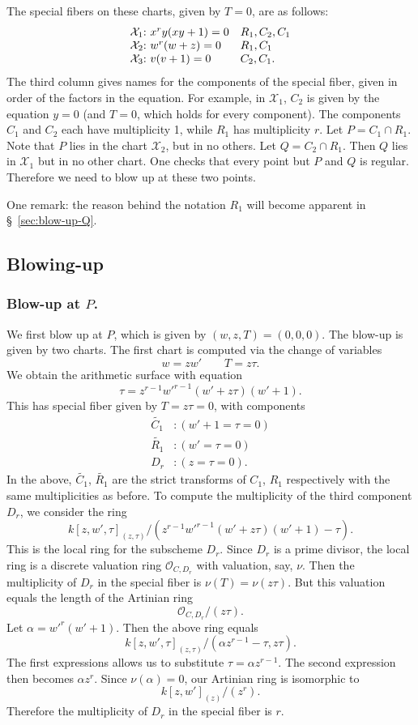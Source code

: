 \documentclass[reqno]{amsart}
\theoremstyle{definition}
\theoremstyle{remark}
\def\XX{\mathcal{X}}
\def\sO{\mathcal{O}}
\begin{document}
The special fibers on these charts, given by $T = 0$, are as follows:
\[
\begin{array}{l@{:\,\,}ll}
\XX_1 & x^ry(xy+1) = 0 & R_1, C_2, C_1 \\
\XX_2 & w^r(w + z) = 0 & R_1, C_1 \\
\XX_3 & v(v + 1) = 0 & C_2, C_1.
\end{array}
\]
The third column gives names for the components of the special fiber, given in order of the factors in the equation. For example, in $\XX_1$, $C_2$ is given by the equation $y = 0$ (and $T = 0$, which holds for every component). The components $C_1$ and $C_2$ each have multiplicity 1, while $R_1$ has multiplicity $r$. Let $P = C_1 \cap R_1$. Note that $P$ lies in the chart $\XX_2$, but in no others. Let $Q = C_2 \cap R_1$. Then $Q$ lies in $\XX_1$ but in no other chart. One checks that every point but $P$ and $Q$ is regular. Therefore we need to blow up at these two points.

One remark: the reason behind the notation $R_1$ will become apparent in \S~\ref{sec:blow-up-Q}.

\subsection{Blowing-up}
\label{sec:blowing-up}

\subsubsection{Blow-up at $P$.}
\label{sec:blow-up-P}

We first blow up at $P$, which is given by $(w,z,T) = (0,0,0)$. The blow-up is given by two charts. The first chart is computed via the change of variables
\[
w = zw' \qquad T = z\tau.
\]
We obtain the arithmetic surface with equation
\[
\tau = z^{r-1}w'^{r-1}(w' + z\tau)(w' + 1).
\]
This has special fiber given by $T = z\tau = 0$, with components
\begin{align*}
  \tilde{C_1}&: (w' + 1 = \tau = 0) \\
  \tilde{R_1}&: (w' = \tau = 0) \\
  D_r&: (z = \tau = 0).
\end{align*}
In the above, $\tilde{C_1}$, $\tilde{R_1}$ are the strict transforms of $C_1$, $R_1$ respectively with the same multiplicities as before. To compute the multiplicity of the third component $D_r$, we consider the ring
\[
{k[z,w',\tau]_{(z,\tau)}}/{(z^{r-1}w'^{r-1}(w' + z\tau)(w' + 1) - \tau)}.
\]
This is the local ring for the subscheme $D_r$. Since $D_r$ is a prime divisor, the local ring is a discrete valuation ring $\sO_{C,D_r}$ with valuation, say, $\nu$. Then the multiplicity of $D_r$ in the special fiber is $\nu(T) = \nu(z\tau)$. But this valuation equals the length of the Artinian ring
\[
{\sO_{C,D_r}}/{(z\tau)}.
\]
Let $\alpha = w'^{r}(w'+1)$. Then the above ring equals
\[
{k[z,w',\tau]_{(z,\tau)}}/{(\alpha z^{r-1} - \tau, z\tau)}.
\]
The first expressions allows us to substitute $\tau = \alpha z^{r-1}$. The second expression then becomes $\alpha z^r$. Since $\nu(\alpha) = 0$, our Artinian ring is isomorphic to
\[
{k[z,w']_{(z)}}/{(z^r)}.
\]
Therefore the multiplicity of $D_r$ in the special fiber is $r$.
\end{document}
